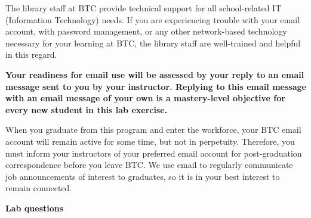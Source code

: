 The library staff at BTC provide technical support for all school-related IT (Information Technology) needs.  If you are experiencing trouble with your email account, with password management, or any other network-based technology necessary for your learning at BTC, the library staff are well-trained and helpful in this regard.

{\bf Your readiness for email use will be assessed by your reply to an email message sent to you by your instructor.  Replying to this email message with an email message of your own is a mastery-level objective for every new student in this lab exercise.}

When you graduate from this program and enter the workforce, your BTC email account will remain active for some time, but not in perpetuity.  Therefore, you must inform your instructors of your preferred email account for post-graduation correspondence before you leave BTC.  We use email to regularly communicate job announcements of interest to graduates, so it is in your best interest to remain connected.

\vskip 10pt

















\vfil \eject

\noindent
{\bf Lab questions}

\vskip 20pt

